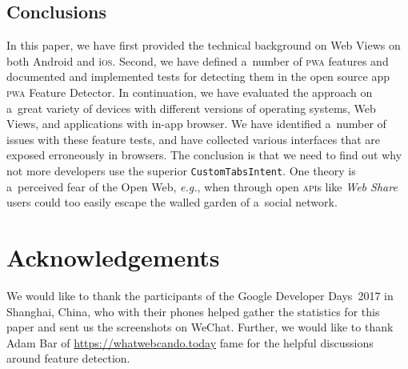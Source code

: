 \documentclass[sigconf]{acmart}
\begin{document}
\subsection{Conclusions}

In this paper, we have first provided the technical background on Web Views
on both Android and i\textsc{os}.
Second, we have defined a~number of \textsc{pwa} features
and documented and implemented tests for detecting them
in the open source app \textsc{pwa} Feature Detector. 
In continuation, we have evaluated the approach on a~great variety of devices
with different versions of operating systems, Web Views,
and applications with in-app browser.
We have identified a~number of issues with these feature tests,
and have collected various interfaces that are exposed erroneously in browsers.
The conclusion is that we need to find out why not more developers use
the superior \texttt{CustomTabsIntent}.
One theory is a~perceived fear of the Open Web, \emph{e.g.},
when through open \textsc{api}s like \emph{Web Share} users could too easily
escape the walled garden of a~social network.

\section*{Acknowledgements}

We would like to thank the participants of the Google Developer Days~2017 in Shanghai, China,
who with their phones helped gather the statistics for this paper and sent us
the screenshots on WeChat.
Further, we would like to thank Adam Bar of \url{https://whatwebcando.today} fame
for the helpful discussions around feature detection.
\end{document}
